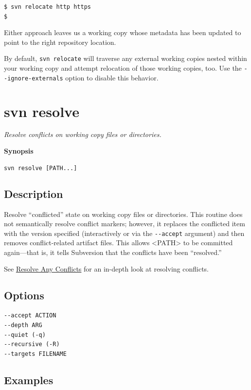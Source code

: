 \begin{verbatim}
$ svn relocate http https
$
\end{verbatim}

Either approach leaves us a working copy whose metadata has been updated
to point to the right repository location.

By default, \texttt{svn\ relocate} will traverse any external working
copies nested within your working copy and attempt relocation of those
working copies, too. Use the \texttt{-\/-ignore-externals} option to
disable this behavior.

\section{svn resolve}\label{svn.ref.svn.c.resolve}

\emph{Resolve conflicts on working copy files or directories.}

\textbf{Synopsis}

\texttt{svn\ resolve\ {[}PATH...{]}}

\subsection{Description}

Resolve ``conflicted'' state on working copy files or directories. This
routine does not semantically resolve conflict markers; however, it
replaces the conflicted item with the version specified (interactively
or via the \texttt{-\/-accept} argument) and then removes
conflict-related artifact files. This allows
\textless PATH\textgreater{} to be committed again---that is, it tells
Subversion that the conflicts have been ``resolved.''

See \hyperref[svn.tour.cycle.resolve]{Resolve Any Conflicts} for an
in-depth look at resolving conflicts.

\subsection{Options}

\begin{verbatim}
--accept ACTION
--depth ARG
--quiet (-q)
--recursive (-R)
--targets FILENAME
\end{verbatim}

\subsection{Examples}

